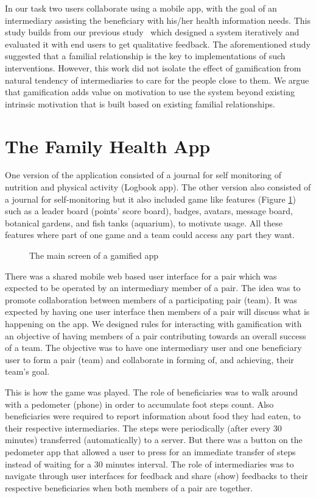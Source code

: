 \documentclass{sig-alternate}
\begin{document}
In our task two users collaborate using a mobile app, with the goal of an intermediary assisting the beneficiary with his/her health information needs. This study builds from our previous study~\cite{katule2016:leveraging} which designed a system iteratively and evaluated it with end users to get qualitative feedback. The aforementioned study suggested that a familial relationship is the key to implementations of such interventions. However, this work did not isolate the effect of gamification from natural tendency of intermediaries to care for the people close to them. We argue that gamification adds value on motivation to use the system beyond existing intrinsic motivation that is built based on existing familial relationships. 

\section{The Family Health App}\label{gamfeatures}
One version of the application consisted of a journal for self monitoring of nutrition and physical activity (Logbook app). The other version also consisted of a journal for self-monitoring but it also included game like features (Figure \ref{figure:gameapp}) such as a leader board (points' score board), badges, avatars, message board, botanical gardens, and fish tanks (aquarium), to motivate usage. All these features where part of one game and a team could access any part they want. 

\begin{figure}[H]
\centering
{}
\caption{The main screen of a gamified app}
\label{figure:gameapp}
\end{figure}

There was a shared mobile web based user interface for a pair which was expected to be operated by  an intermediary member of a pair. The idea was to promote collaboration between members of a participating pair (team). It was expected by having one user interface then members of a pair will discuss what is happening on the app. We designed rules for interacting with gamification with an objective of having members of a pair contributing towards an overall success of a team. The objective was to have one intermediary user and one beneficiary user to form a pair (team) and collaborate in forming of, and achieving, their team's goal. 

This is how the game was played. The role of beneficiaries was to walk around with a pedometer (phone) in order to accumulate foot steps count. Also beneficiaries were required to report information about food they had eaten, to their respective intermediaries. The steps were periodically (after every 30 minutes) transferred (automatically) to a server. But there was a button on the pedometer app that allowed a user to press for an immediate transfer of steps instead of waiting for a 30 minutes interval. The role  of intermediaries was to navigate through user interfaces for feedback and share (show) feedbacks to their respective beneficiaries when both members of a pair are together.
\end{document}
